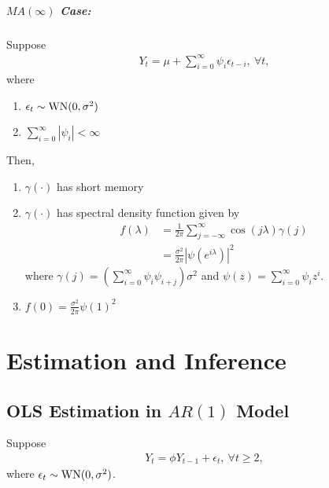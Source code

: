 \documentclass[11pt]{elegantbook}
\begin{document}
\paragraph*{$MA(\infty)$ Case:}
Suppose
\begin{equation}
    \begin{aligned}
        Y_t=\mu+\sum_{i=0}^\infty \psi_i\epsilon_{t-i},\ \forall t,
    \end{aligned}
    \nonumber
\end{equation}
where
\begin{enumerate}[$\cdot$]
    \item $\epsilon_t\sim \textnormal{WN}(0,\sigma^2)$
    \item $\sum_{i=0}^\infty |\psi_i|<\infty$
\end{enumerate}
Then,
\begin{enumerate}[$\circ$]
    \item $\gamma(\cdot)$ has short memory
    \item $\gamma(\cdot)$ has spectral density function given by
    \begin{equation}
        \begin{aligned}
            f(\lambda)&=\frac{1}{2\pi}\sum_{j=-\infty}^\infty \cos\left(j\lambda\right)\gamma(j)\\
            &=\frac{\sigma^2}{2\pi}|\psi(e^{i\lambda})|^2
        \end{aligned}
        \nonumber
    \end{equation}
    where $\gamma(j)=(\sum_{i=0}^\infty \psi_i\psi_{i+j})\sigma^2$ and $\psi(z)=\sum_{i=0}^\infty \psi_iz^i$.
    \item $f(0)=\frac{\sigma^2}{2\pi}\psi(1)^2$
\end{enumerate}


\chapter{Estimation and Inference}

\section{OLS Estimation in $AR(1)$ Model}
Suppose
\begin{equation}
    \begin{aligned}
        Y_t=\phi Y_{t-1}+\epsilon_t,\ \forall t\geq 2,
    \end{aligned}
    \nonumber
\end{equation}
where $\epsilon_t\sim \textnormal{WN}(0,\sigma^2)$.
\end{document}
